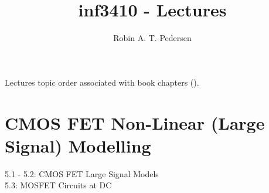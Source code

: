 \documentclass[twocolumn]{article}
\begin{document}
  \title{inf3410 - Lectures}
  \author{Robin A. T. Pedersen}
  \maketitle

  Lectures topic order associated with book chapters (\book).

  \section{CMOS FET Non-Linear (Large Signal) Modelling}
    5.1 - 5.2: CMOS FET Large Signal Models \\
    5.3: MOSFET Circuits at DC
\end{document}

